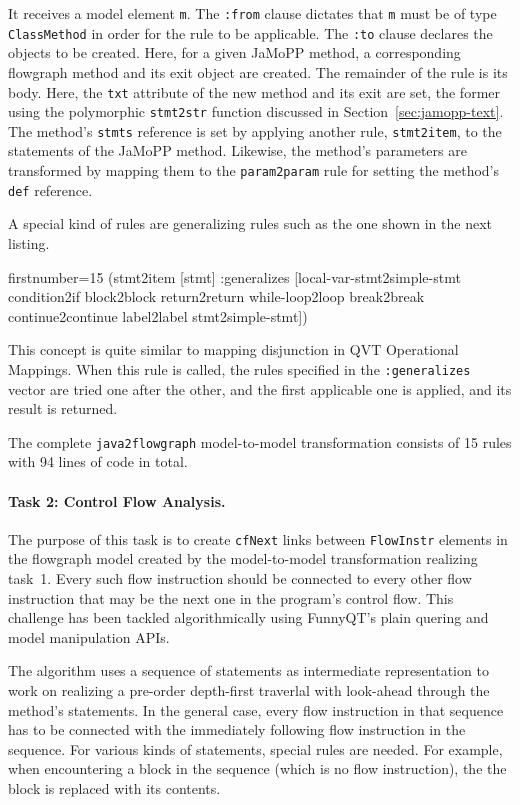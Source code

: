 \documentclass[submission]{eptcs}
\begin{document}
It receives a model element \verb|m|.  The \verb|:from| clause dictates that
\verb|m| must be of type \verb|ClassMethod| in order for the rule to be
applicable.  The \verb|:to| clause declares the objects to be created.  Here,
for a given JaMoPP method, a corresponding flowgraph method and its exit object
are created.  The remainder of the rule is its body.  Here, the \verb|txt|
attribute of the new method and its exit are set, the former using the
polymorphic \verb|stmt2str| function discussed in
Section~\ref{sec:jamopp-text}.  The method's \verb|stmts| reference is set by
applying another rule, \verb|stmt2item|, to the statements of the JaMoPP
method.  Likewise, the method's parameters are transformed by mapping them to
the \verb|param2param| rule for setting the method's \verb|def| reference.

A special kind of rules are generalizing rules such as the one shown in the
next listing.

\begin{clojurecode*}{firstnumber=15}
  (stmt2item [stmt]
      :generalizes [local-var-stmt2simple-stmt condition2if block2block
                    return2return while-loop2loop break2break continue2continue
                    label2label stmt2simple-stmt])
\end{clojurecode*}

This concept is quite similar to mapping disjunction in QVT Operational
Mappings.  When this rule is called, the rules specified in the
\verb|:generalizes| vector are tried one after the other, and the first
applicable one is applied, and its result is returned.

The complete \verb|java2flowgraph| model-to-model transformation consists of 15
rules with 94 lines of code in total.


\paragraph{Task 2: Control Flow Analysis.}
\label{sec:task-2}

The purpose of this task is to create \verb|cfNext| links between
\verb|FlowInstr| elements in the flowgraph model created by the model-to-model
transformation realizing task~1.  Every such flow instruction should be
connected to every other flow instruction that may be the next one in the
program's control flow.  This challenge has been tackled algorithmically using
FunnyQT's plain quering and model manipulation APIs.

The algorithm uses a sequence of statements as intermediate representation to
work on realizing a pre-order depth-first traverlal with look-ahead through the
method's statements.  In the general case, every flow instruction in that
sequence has to be connected with the immediately following flow instruction in
the sequence.  For various kinds of statements, special rules are needed.  For
example, when encountering a block in the sequence (which is no flow
instruction), the the block is replaced with its contents.
\end{document}
